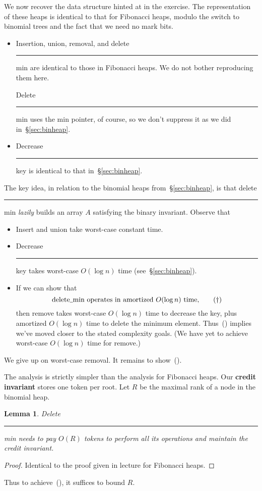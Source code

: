 \documentclass[a4paper]{article}
\newtheorem{mylemma}{\textbf{Lemma}}
\newcommand{\any}{{\rule[-.2ex]{1ex}{.4pt}}}	%
\newcommand*{\Sref}[1]{\hyperref[#1]{\S\ref*{#1}}}
\begin{document}
We now recover the data structure hinted at in the exercise.
The representation of these heaps is identical to that for Fibonacci heaps, modulo the switch to binomial trees and the fact that we need no mark bits.
\begin{itemize}
	\item Insertion, union, removal, and delete\any{}min are identical to those in Fibonacci heaps.
	We do not bother reproducing them here.
	
	Delete\any{}min uses the min pointer, of course, so we don't suppress it as we did in~\Sref{sec:binheap}.

	\item Decrease\any{}key is identical to that in~\Sref{sec:binheap}.
\end{itemize}
The key idea, in relation to the binomial heaps from~\Sref{sec:binheap}, is that delete\any{}min \emph{lazily} builds an array $A$ satisfying the binary invariant.
Observe that
\begin{itemize}
	\item Insert and union take worst-case constant time.
	\item Decrease\any{}key takes worst-case $O(\log n)$ time (see~\Sref{sec:binheap}).
	\item If we can show that
	\[
		\text{delete\any{}min operates in amortized $O(\log n)$ time,}\tag{\dag}
	\]
	then remove takes worst-case $O(\log n)$ time to decrease the key, plus amortized $O(\log n)$ time to delete the minimum element.
	Thus~(\dag) implies we've moved closer to the stated complexity goals.
	(We have yet to achieve worst-case $O(\log n)$ time for remove.)
\end{itemize}
We give up on worst-case removal.
It remains to show~(\dag).

The analysis is strictly simpler than the analysis for Fibonacci heaps.
Our \textbf{credit invariant} stores one token per root.
Let $R$ be the maximal rank of a node in the binomial heap.

\begin{mylemma}
	Delete\any{}min needs to pay $O(R)$ tokens to perform all its operations and maintain the credit invariant.
\end{mylemma}

\begin{proof}
	Identical to the proof given in lecture for Fibonacci heaps.
\end{proof}

Thus to achieve~(\dag), it suffices to bound $R$.
\end{document}

